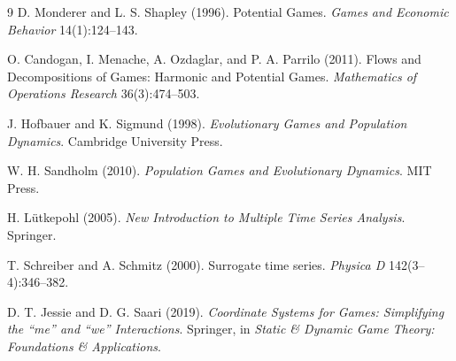 \documentclass[11pt]{article}
\begin{document}
\begin{thebibliography}{9}
D. Monderer and L. S. Shapley (1996).
\newblock Potential Games.
\newblock \emph{Games and Economic Behavior} 14(1):124--143.

O. Candogan, I. Menache, A. Ozdaglar, and P. A. Parrilo (2011).
\newblock Flows and Decompositions of Games: Harmonic and Potential Games.
\newblock \emph{Mathematics of Operations Research} 36(3):474--503.

J. Hofbauer and K. Sigmund (1998).
\newblock \emph{Evolutionary Games and Population Dynamics}.
\newblock Cambridge University Press.

W. H. Sandholm (2010).
\newblock \emph{Population Games and Evolutionary Dynamics}.
\newblock MIT Press.

H. L\"{u}tkepohl (2005).
\newblock \emph{New Introduction to Multiple Time Series Analysis}.
\newblock Springer.

T. Schreiber and A. Schmitz (2000).
\newblock Surrogate time series.
\newblock \emph{Physica D} 142(3--4):346--382.

D. T. Jessie and D. G. Saari (2019).
\newblock \emph{Coordinate Systems for Games: Simplifying the ``me'' and ``we'' Interactions}.
\newblock Springer, in \emph{Static \& Dynamic Game Theory: Foundations \& Applications}.
\end{thebibliography}
\end{document}
